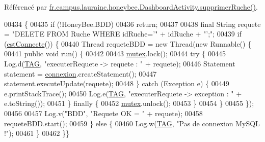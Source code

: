 Référencé par \hyperlink{classfr_1_1campus_1_1laurainc_1_1honeybee_1_1_dashboard_activity_ae77451bd85101ed42644c2421cd2234f}{fr.\+campus.\+laurainc.\+honeybee.\+Dashboard\+Activity.\+supprimer\+Ruche()}.


\begin{DoxyCode}
00434                                                   \{
00435         \textcolor{keywordflow}{if} (!HoneyBee.BDD)
00436             \textcolor{keywordflow}{return};
00437 
00438         \textcolor{keyword}{final} String requete = \textcolor{stringliteral}{"DELETE FROM Ruche WHERE idRuche='"} + idRuche + \textcolor{stringliteral}{"';"};
00439         \textcolor{keywordflow}{if} (\hyperlink{classfr_1_1campus_1_1laurainc_1_1honeybee_1_1_base_de_donnees_a735f54c2c183a595c9a9a5ba947491f5}{estConnecte}()) \{
00440             Thread requeteBDD = \textcolor{keyword}{new} Thread(\textcolor{keyword}{new} Runnable() \{
00441                 \textcolor{keyword}{public} \textcolor{keywordtype}{void} run() \{
00442 
00443                     \hyperlink{classfr_1_1campus_1_1laurainc_1_1honeybee_1_1_base_de_donnees_a0dd6f285a11459c086adea6080bed282}{mutex}.lock();
00444                     \textcolor{keywordflow}{try} \{
00445                         Log.d(\hyperlink{classfr_1_1campus_1_1laurainc_1_1honeybee_1_1_base_de_donnees_ae800d867b3e423dd139e982736ab5587}{TAG}, \textcolor{stringliteral}{"executerRequete -> requete : "} + requete);
00446                         Statement statement = \hyperlink{classfr_1_1campus_1_1laurainc_1_1honeybee_1_1_base_de_donnees_a358899633f17b8cd00dd2c4cfdd40abe}{connexion}.createStatement();
00447                         statement.executeUpdate(requete);
00448                     \} \textcolor{keywordflow}{catch} (Exception e) \{
00449                         e.printStackTrace();
00450                         Log.e(\hyperlink{classfr_1_1campus_1_1laurainc_1_1honeybee_1_1_base_de_donnees_ae800d867b3e423dd139e982736ab5587}{TAG}, \textcolor{stringliteral}{"executerRequete -> exception : "} + e.toString());
00451                     \} \textcolor{keywordflow}{finally} \{
00452                         \hyperlink{classfr_1_1campus_1_1laurainc_1_1honeybee_1_1_base_de_donnees_a0dd6f285a11459c086adea6080bed282}{mutex}.unlock();
00453                     \}
00454                 \}
00455             \});
00456 
00457             Log.v(\textcolor{stringliteral}{"BDD"}, \textcolor{stringliteral}{"Requete OK = "} + requete);
00458             requeteBDD.start();
00459         \} \textcolor{keywordflow}{else} \{
00460             Log.w(\hyperlink{classfr_1_1campus_1_1laurainc_1_1honeybee_1_1_base_de_donnees_ae800d867b3e423dd139e982736ab5587}{TAG}, \textcolor{stringliteral}{"Pas de connexion MySQL !"});
00461         \}
00462     \}\}
\end{DoxyCode}


